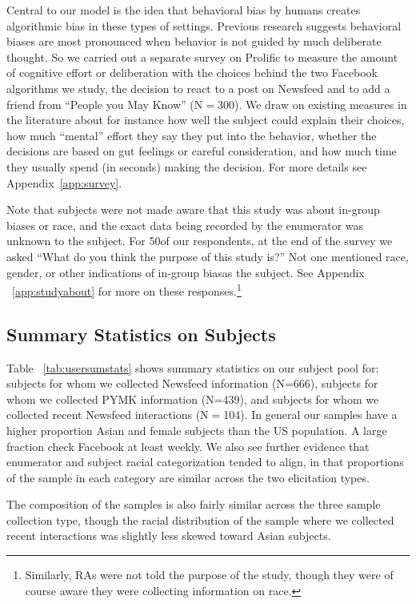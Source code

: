 \documentclass[12pt,letterpaper]{article}
\newcommand{\ProlificSampleSize}{300}
\newcommand{\RecentInteractionsSampleSize}{104}
\newcommand{\StudyAboutSampleSize}{50}
\begin{document}
Central to our model is the idea that behavioral bias by humans creates algorithmic bias in these types of settings. Previous research suggests behavioral biases are most pronounced when behavior is not guided by much deliberate thought. So we carried out a separate survey on Prolific to measure the amount of cognitive effort or deliberation with the choices behind the two Facebook algorithms we study, the decision to react to a post on Newsfeed and to add a friend from ``People you May Know'' (N$=$\ProlificSampleSize). We draw on existing measures in the literature about for instance how well the subject could explain their choices, how much ``mental'' effort they say they put into the behavior, whether the decisions are based on gut feelings or careful consideration, and how much time they usually spend (in seconds) making the decision. For more details see Appendix~\ref{app:survey}.

Note that subjects were not made aware that this study was about in-group biases or race, and the exact data being recorded by the enumerator was unknown to the subject. For \StudyAboutSampleSize of our respondents, at the end of the survey we asked ``What do you think the purpose of this study is?'' Not one mentioned race, gender, or other indications of in-group biasas the subject. See Appendix ~\ref{app:studyabout} for more on these responses.\footnote{Similarly, RAs were not told the purpose of the study, though they were of course aware they were collecting information on race.}

\subsection{Summary Statistics on Subjects}

Table ~\ref{tab:usersumstats} shows summary statistics on our subject pool for: subjects for whom we collected Newsfeed information (N=666), subjects for whom we collected PYMK information (N=439), and subjects for whom we collected recent Newsfeed interactions (N$=$\RecentInteractionsSampleSize).  In general our samples have a higher proportion Asian and female subjects than the US population.  A large fraction check Facebook at least weekly.  We also see further evidence that enumerator and subject racial categorization tended to align, in that proportions of the sample in each category are similar across the two elicitation types.

The composition of the samples is also fairly similar across the three sample collection type, though the racial distribution of the sample where we collected recent interactions was slightly less skewed toward Asian subjects. 
\end{document}
